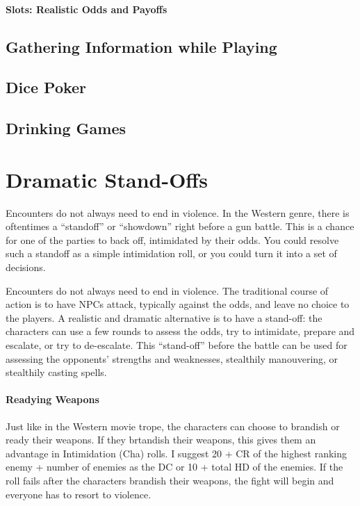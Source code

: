 \documentclass[twocolumn]{dndbook}
\begin{document}
\paragraph{Slots: Realistic Odds and Payoffs}

\subsection{Gathering Information while Playing}

\subsection{Dice Poker}


\subsection{Drinking Games}

\section{Dramatic Stand-Offs}
\label{sec:dramatic_standoff}


Encounters do not always need to end in violence.
In the Western genre, there is oftentimes a ``standoff'' or ``showdown'' right before a gun battle.
This is a chance for one of the parties to back off, intimidated by their odds.
You could resolve such a standoff as a simple intimidation roll, or you could turn it into a set of decisions.\par

\begin{emphasisParagraph}
	Encounters do not always need to end in violence.
	The traditional course of action is to have NPCs attack, typically against the odds, and leave no choice to the players.
	A realistic and dramatic alternative is to have a stand-off: the characters can use a few rounds to assess the odds,
	try to intimidate, prepare and escalate, or try to de-escalate.
	This ``stand-off'' before the battle can be used for assessing the opponents' strengths and weaknesses,
	stealthily manouvering, or stealthily casting spells.
\end{emphasisParagraph}

\paragraph*{Readying Weapons}
Just like in the Western movie trope, the characters can choose to brandish or ready their weapons.
If they brtandish their weapons, this gives them an advantage in Intimidation (Cha) rolls.
I suggest 20 + CR of the highest ranking enemy + number of enemies as the DC or 10 + total HD of the enemies.
If the roll fails after the characters brandish their weapons, the fight will begin and everyone has to resort to violence.\par
\end{document}
